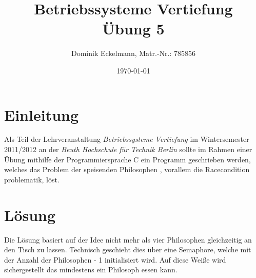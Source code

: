 \documentclass[a4paper]{article}
\title{Betriebssysteme Vertiefung \\ Übung 5}
\author{Dominik Eckelmann, Matr.-Nr.: 785856}
\date{\today}
\begin{document}
\maketitle

\tableofcontents

\section{Einleitung}
Als Teil der Lehrveranstaltung \textit{Betriebssysteme Vertiefung} im Wintersemester 2011/2012 an der \textit{Beuth Hochschule für Technik Berlin} sollte im Rahmen einer Übung mithilfe der Programmiersprache C ein Programm geschrieben werden, welches das Problem der speisenden Philosophen , vorallem die Racecondition problematik, löst.

\section{Lösung}
Die Lösung basiert auf der Idee nicht mehr als vier Philosophen gleichzeitig an den Tisch zu lassen.
Technisch geschieht dies über eine Semaphore, welche mit der Anzahl
der Philosophen - 1 initialisiert wird. Auf diese Weiße wird sichergestellt das mindestens ein Philosoph essen kann.
\end{document}
